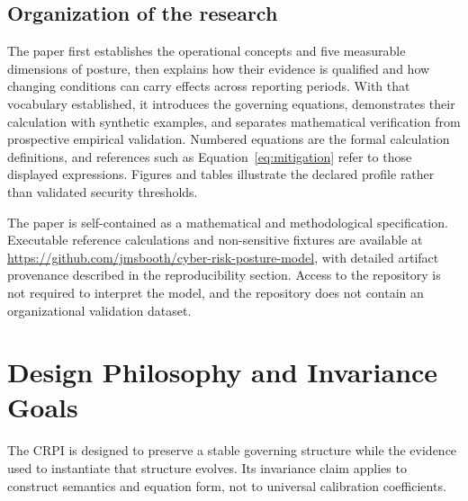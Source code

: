 \documentclass[11pt]{article}
\begin{document}
\subsection*{Organization of the research}
The paper first establishes the operational concepts and five measurable dimensions of
posture, then explains how their evidence is qualified and how changing conditions can
carry effects across reporting periods. With that vocabulary established, it introduces
the governing equations, demonstrates their calculation with synthetic examples, and
separates mathematical verification from prospective empirical validation.
Numbered equations are the formal calculation definitions, and references such as
Equation~\ref{eq:mitigation} refer to those displayed expressions. Figures and tables
illustrate the declared profile rather than validated security thresholds.

The paper is self-contained as a mathematical and methodological specification.
Executable reference calculations and non-sensitive fixtures are available at
\url{https://github.com/jmsbooth/cyber-risk-posture-model}, with detailed artifact
provenance described in the reproducibility section. Access to the repository is not
required to interpret the model, and the repository does not contain an organizational
validation dataset.

\section{Design Philosophy and Invariance Goals}
\label{sec:design}
The CRPI is designed to preserve a stable governing structure while the evidence used
to instantiate that structure evolves. Its invariance claim applies to construct
semantics and equation form, not to universal calibration coefficients.
\end{document}
